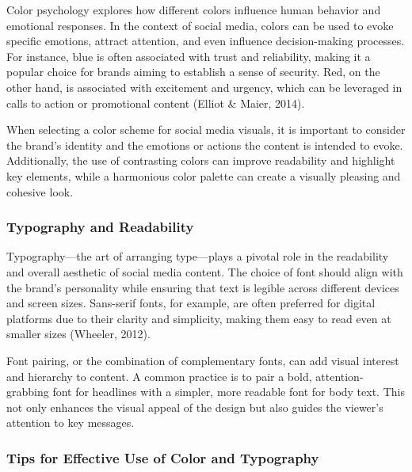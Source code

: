 \documentclass[
]{book}
\begin{document}
Color psychology explores how different colors influence human behavior and emotional responses. In the context of social media, colors can be used to evoke specific emotions, attract attention, and even influence decision-making processes. For instance, blue is often associated with trust and reliability, making it a popular choice for brands aiming to establish a sense of security. Red, on the other hand, is associated with excitement and urgency, which can be leveraged in calls to action or promotional content (Elliot \& Maier, 2014).

When selecting a color scheme for social media visuals, it is important to consider the brand's identity and the emotions or actions the content is intended to evoke. Additionally, the use of contrasting colors can improve readability and highlight key elements, while a harmonious color palette can create a visually pleasing and cohesive look.

\hypertarget{typography-and-readability}{%
\subsubsection*{Typography and Readability}\label{typography-and-readability}}

Typography---the art of arranging type---plays a pivotal role in the readability and overall aesthetic of social media content. The choice of font should align with the brand's personality while ensuring that text is legible across different devices and screen sizes. Sans-serif fonts, for example, are often preferred for digital platforms due to their clarity and simplicity, making them easy to read even at smaller sizes (Wheeler, 2012).

Font pairing, or the combination of complementary fonts, can add visual interest and hierarchy to content. A common practice is to pair a bold, attention-grabbing font for headlines with a simpler, more readable font for body text. This not only enhances the visual appeal of the design but also guides the viewer's attention to key messages.

\hypertarget{tips-for-effective-use-of-color-and-typography}{%
\subsubsection*{Tips for Effective Use of Color and Typography}\label{tips-for-effective-use-of-color-and-typography}}
\end{document}
